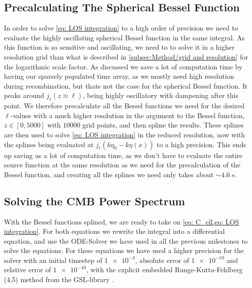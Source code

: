 \documentclass[10pt,a4paper]{article}
\begin{document}
\subsection{Precalculating The Spherical Bessel Function}
\label{subsubsec:Method/Bessel function}
In order to solve \cref{eq: LOS integration} to a high order of precision we need to evaluate the highly oscillating spherical Bessel function in the same integral. As this function is so sensitive and oscillating, we need to to solve it in a higher resolution grid than what is described in \cref{subsec:Method/grid and resolution} for the logarithmic scale factor. As discussed we save a lot of computation time by having our sparsely populated time array, as we mostly need high resolution during recombination, but thats not the case for the spherical Bessel function. It peaks around $j_\ell(z\approx\ell)$, being highly oscillatory with dampening after this point. We therefore precalculate all the Bessel functions we need for the desired $\ell$-values with a much higher resolution in the argument to the Bessel function, $z\in\left[0,5000\right]$ with $10000$ grid points, and then spline the results. These splines are then used to solve \cref{eq: LOS integration} in the reduced resolution, now with the splines being evaluated at $j_\ell(k\eta_0 -k\eta(x))$ to a high precision. This ends up saving us a lot of computation time, as we don't have to evaluate the entire source function at the same resolution as we need for the precalculation of the Bessel function, and creating all the splines we need only takes about $\sim \SI{4.6}{s}$.

\subsection{Solving the CMB Power Spectrum}
\label{subsec:Method/Solve CMB}
With the Bessel functions splined, we are ready to take on \cref{eq: C_ell,eq: LOS integration}. For both equations we rewrite the integral into a differential equation, and use the ODE-Solver we have used in all the previous milestones to solve the equations. For these equations we have used a higher precision for the solver with an initial timestep of $\num{1e-3}$, absolute error of $\num{1e-10}$ and relative error of $\num{1e-10}$, with the explicit embedded Runge-Kutta-Fehlberg (4,5) method from the GSL-library \citep{gsl-doc}.
\end{document}
